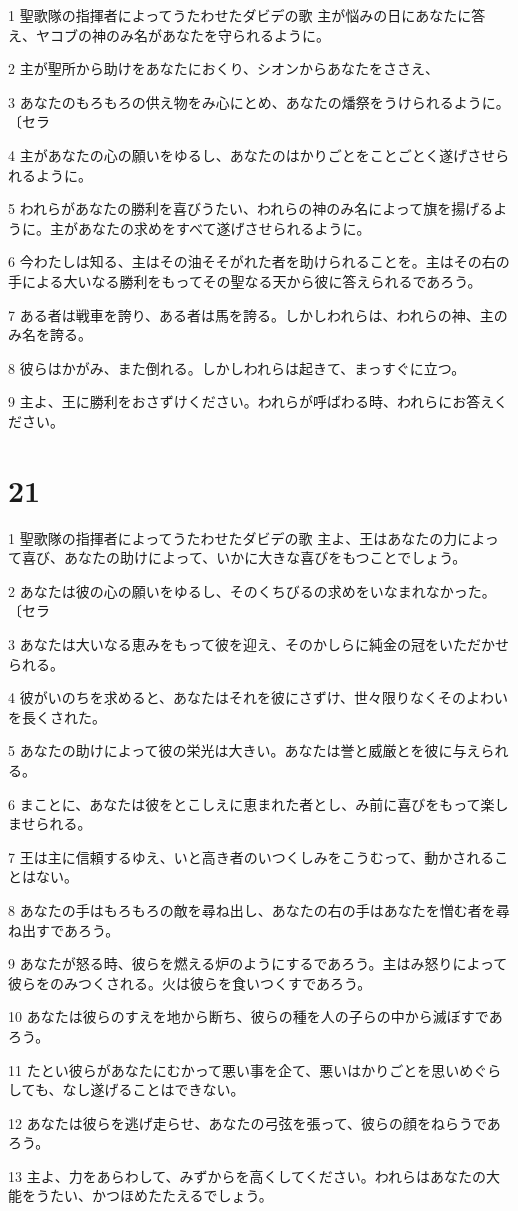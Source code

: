 \par 1 聖歌隊の指揮者によってうたわせたダビデの歌 主が悩みの日にあなたに答え、ヤコブの神のみ名があなたを守られるように。
\par 2 主が聖所から助けをあなたにおくり、シオンからあなたをささえ、
\par 3 あなたのもろもろの供え物をみ心にとめ、あなたの燔祭をうけられるように。〔セラ
\par 4 主があなたの心の願いをゆるし、あなたのはかりごとをことごとく遂げさせられるように。
\par 5 われらがあなたの勝利を喜びうたい、われらの神のみ名によって旗を揚げるように。主があなたの求めをすべて遂げさせられるように。
\par 6 今わたしは知る、主はその油そそがれた者を助けられることを。主はその右の手による大いなる勝利をもってその聖なる天から彼に答えられるであろう。
\par 7 ある者は戦車を誇り、ある者は馬を誇る。しかしわれらは、われらの神、主のみ名を誇る。
\par 8 彼らはかがみ、また倒れる。しかしわれらは起きて、まっすぐに立つ。
\par 9 主よ、王に勝利をおさずけください。われらが呼ばわる時、われらにお答えください。

\chapter{21}

\par 1 聖歌隊の指揮者によってうたわせたダビデの歌 主よ、王はあなたの力によって喜び、あなたの助けによって、いかに大きな喜びをもつことでしょう。
\par 2 あなたは彼の心の願いをゆるし、そのくちびるの求めをいなまれなかった。〔セラ
\par 3 あなたは大いなる恵みをもって彼を迎え、そのかしらに純金の冠をいただかせられる。
\par 4 彼がいのちを求めると、あなたはそれを彼にさずけ、世々限りなくそのよわいを長くされた。
\par 5 あなたの助けによって彼の栄光は大きい。あなたは誉と威厳とを彼に与えられる。
\par 6 まことに、あなたは彼をとこしえに恵まれた者とし、み前に喜びをもって楽しませられる。
\par 7 王は主に信頼するゆえ、いと高き者のいつくしみをこうむって、動かされることはない。
\par 8 あなたの手はもろもろの敵を尋ね出し、あなたの右の手はあなたを憎む者を尋ね出すであろう。
\par 9 あなたが怒る時、彼らを燃える炉のようにするであろう。主はみ怒りによって彼らをのみつくされる。火は彼らを食いつくすであろう。
\par 10 あなたは彼らのすえを地から断ち、彼らの種を人の子らの中から滅ぼすであろう。
\par 11 たとい彼らがあなたにむかって悪い事を企て、悪いはかりごとを思いめぐらしても、なし遂げることはできない。
\par 12 あなたは彼らを逃げ走らせ、あなたの弓弦を張って、彼らの顔をねらうであろう。
\par 13 主よ、力をあらわして、みずからを高くしてください。われらはあなたの大能をうたい、かつほめたたえるでしょう。

